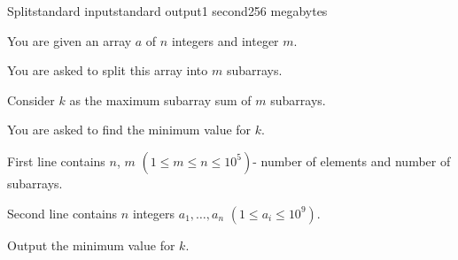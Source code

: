 \begin{problem}{Split}{standard input}{standard output}{1 second}{256 megabytes}

You are given an array $a$ of $n$ integers and integer $m$.

You are asked to split this array into $m$ subarrays.

Consider $k$ as the maximum subarray sum of $m$ subarrays.

You are asked to find the minimum value for $k$.

\InputFile
First line contains $n$, $m$ $(1\le m \le n \le 10^5) $- number of elements and number of subarrays.

Second line contains $n$ integers $a_1, \dots,a_n$ $(1\le a_i \le 10^9) $.

\OutputFile
Output the minimum value for $k$.

\Examples

\begin{example}
%
%
\end{example}

\end{problem}

